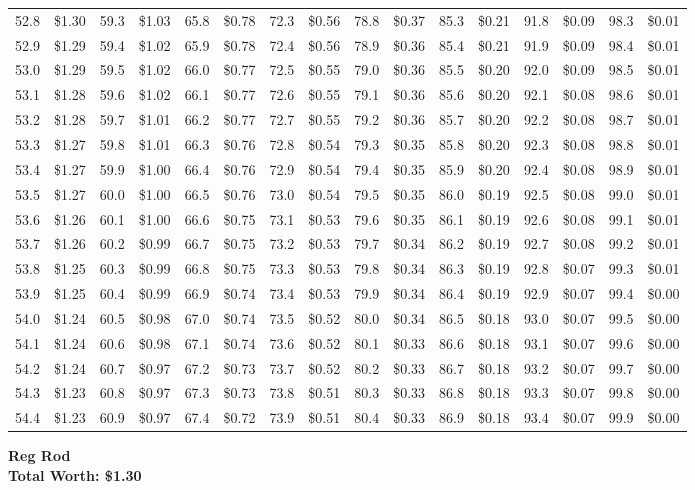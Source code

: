 \documentclass{article}
\begin{document}
\begin{tabular}{|*{8}{rr|}}
52.8 & \$1.30 & 59.3 & \$1.03 & 65.8 & \$0.78 & 72.3 & \$0.56 & 78.8 & \$0.37 & 85.3 & \$0.21 & 91.8 & \$0.09 & 98.3 & \$0.01\\
52.9 & \$1.29 & 59.4 & \$1.02 & 65.9 & \$0.78 & 72.4 & \$0.56 & 78.9 & \$0.36 & 85.4 & \$0.21 & 91.9 & \$0.09 & 98.4 & \$0.01\\
53.0 & \$1.29 & 59.5 & \$1.02 & 66.0 & \$0.77 & 72.5 & \$0.55 & 79.0 & \$0.36 & 85.5 & \$0.20 & 92.0 & \$0.09 & 98.5 & \$0.01\\
53.1 & \$1.28 & 59.6 & \$1.02 & 66.1 & \$0.77 & 72.6 & \$0.55 & 79.1 & \$0.36 & 85.6 & \$0.20 & 92.1 & \$0.08 & 98.6 & \$0.01\\
53.2 & \$1.28 & 59.7 & \$1.01 & 66.2 & \$0.77 & 72.7 & \$0.55 & 79.2 & \$0.36 & 85.7 & \$0.20 & 92.2 & \$0.08 & 98.7 & \$0.01\\
53.3 & \$1.27 & 59.8 & \$1.01 & 66.3 & \$0.76 & 72.8 & \$0.54 & 79.3 & \$0.35 & 85.8 & \$0.20 & 92.3 & \$0.08 & 98.8 & \$0.01\\
53.4 & \$1.27 & 59.9 & \$1.00 & 66.4 & \$0.76 & 72.9 & \$0.54 & 79.4 & \$0.35 & 85.9 & \$0.20 & 92.4 & \$0.08 & 98.9 & \$0.01\\
53.5 & \$1.27 & 60.0 & \$1.00 & 66.5 & \$0.76 & 73.0 & \$0.54 & 79.5 & \$0.35 & 86.0 & \$0.19 & 92.5 & \$0.08 & 99.0 & \$0.01\\
53.6 & \$1.26 & 60.1 & \$1.00 & 66.6 & \$0.75 & 73.1 & \$0.53 & 79.6 & \$0.35 & 86.1 & \$0.19 & 92.6 & \$0.08 & 99.1 & \$0.01\\
53.7 & \$1.26 & 60.2 & \$0.99 & 66.7 & \$0.75 & 73.2 & \$0.53 & 79.7 & \$0.34 & 86.2 & \$0.19 & 92.7 & \$0.08 & 99.2 & \$0.01\\
53.8 & \$1.25 & 60.3 & \$0.99 & 66.8 & \$0.75 & 73.3 & \$0.53 & 79.8 & \$0.34 & 86.3 & \$0.19 & 92.8 & \$0.07 & 99.3 & \$0.01\\
53.9 & \$1.25 & 60.4 & \$0.99 & 66.9 & \$0.74 & 73.4 & \$0.53 & 79.9 & \$0.34 & 86.4 & \$0.19 & 92.9 & \$0.07 & 99.4 & \$0.00\\
54.0 & \$1.24 & 60.5 & \$0.98 & 67.0 & \$0.74 & 73.5 & \$0.52 & 80.0 & \$0.34 & 86.5 & \$0.18 & 93.0 & \$0.07 & 99.5 & \$0.00\\
54.1 & \$1.24 & 60.6 & \$0.98 & 67.1 & \$0.74 & 73.6 & \$0.52 & 80.1 & \$0.33 & 86.6 & \$0.18 & 93.1 & \$0.07 & 99.6 & \$0.00\\
54.2 & \$1.24 & 60.7 & \$0.97 & 67.2 & \$0.73 & 73.7 & \$0.52 & 80.2 & \$0.33 & 86.7 & \$0.18 & 93.2 & \$0.07 & 99.7 & \$0.00\\
54.3 & \$1.23 & 60.8 & \$0.97 & 67.3 & \$0.73 & 73.8 & \$0.51 & 80.3 & \$0.33 & 86.8 & \$0.18 & 93.3 & \$0.07 & 99.8 & \$0.00\\
54.4 & \$1.23 & 60.9 & \$0.97 & 67.4 & \$0.72 & 73.9 & \$0.51 & 80.4 & \$0.33 & 86.9 & \$0.18 & 93.4 & \$0.07 & 99.9 & \$0.00\\

\end{tabular}
\clearpage
{\large\bf Reg Rod\\Total Worth: \$1.30}
\end{document}

